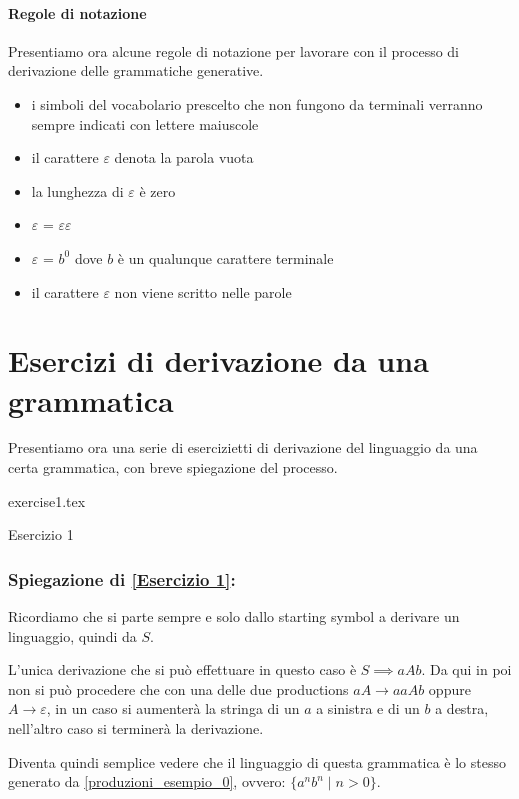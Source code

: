 \documentclass[class=book, crop=false, oneside, 12pt]{standalone}
\begin{document}
\paragraph{Regole di notazione}
Presentiamo ora alcune regole di notazione per lavorare con il processo di derivazione delle grammatiche generative.
\begin{itemize}
    \item i simboli del vocabolario prescelto che non fungono da terminali verranno sempre indicati con lettere maiuscole
    \item il carattere \(\varepsilon\) denota la parola vuota
    \item la lunghezza di \(\varepsilon\) è zero
    \item \(\varepsilon\) = \(\varepsilon\)\(\varepsilon\)
    \item \(\varepsilon\) =  \(b^0\) dove \(b\) è un qualunque carattere terminale
    \item il carattere \(\varepsilon\) non viene scritto nelle parole
\end{itemize}

\section{Esercizi di derivazione da una grammatica}
Presentiamo ora una serie di esercizietti di derivazione del linguaggio da una certa grammatica, con breve spiegazione del processo.

\begin{table}[H]
	\centering
	{exercise1.tex}
    \caption{Esercizio 1}
    \label{Esercizio 1}
\end{table}
\subsubsection*{Spiegazione di \ref{Esercizio 1}:}
Ricordiamo che si parte sempre e solo dallo starting symbol a derivare un linguaggio, quindi da \(S\).

L'unica derivazione che si può effettuare in questo caso è \(S \implies aAb\).
Da qui in poi non si può procedere che con una delle due productions \(aA \to aaAb\) oppure \(A \to \varepsilon\), in un caso si aumenterà la stringa di un \(a\) a sinistra e di un \(b\) a destra, nell'altro caso si terminerà la derivazione.

Diventa quindi semplice vedere che il linguaggio di questa grammatica è lo stesso generato da \ref{produzioni_esempio_0}, ovvero: \(\{a^n b^n \mid n>0\}\).
\end{document}
